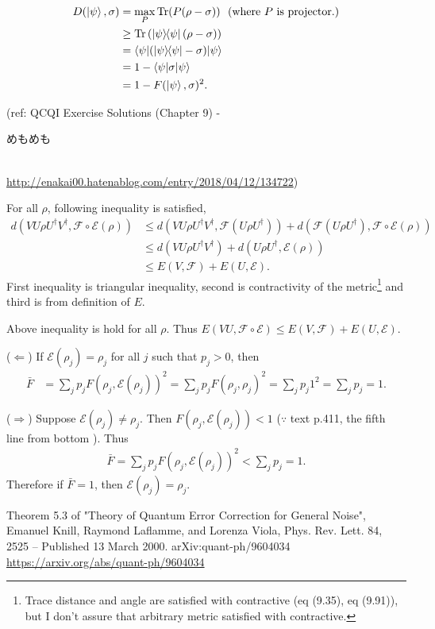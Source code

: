\begin{align*}
    D(\ket{\psi}, \sigma) &= \max_P \operatorname{Tr} (P (\rho - \sigma)) ~~(\text{where } P \text{ is projector.})\\
        &\geq \operatorname{Tr} \left(\ket{\psi}\hspace{-1mm} \bra{\psi} (\rho - \sigma)\right)\\
        &= \braket{\psi | (\ket{\psi}\hspace{-1mm} \bra{\psi} - \sigma) | \psi}\\
        &= 1 - \braket{\psi | \sigma | \psi}\\
        &= 1 - F(\ket{\psi}, \sigma)^2.
\end{align*}

(ref: QCQI Exercise Solutions (Chapter 9) - \begin{CJK}{UTF8}{ipxm}めもめも\end{CJK} \\ \url{http://enakai00.hatenablog.com/entry/2018/04/12/134722})

For all $\rho$, following inequality is satisfied,
\begin{align*}
        d(VU \rho U^\dagger V^\dagger, \mathcal{F} \circ \mathcal{E}(\rho))
        &\leq d(VU \rho U^\dagger V^\dagger, \mathcal{F}(U\rho U^\dagger)) + d(\mathcal{F}(U\rho U^\dagger), \mathcal{F}\circ \mathcal{E}(\rho)) \\
        &\leq d(VU \rho U^\dagger V^\dagger) + d(U\rho U^\dagger, \mathcal{E}(\rho))\\
        &\leq E(V, \mathcal{F})+ E(U, \mathcal{E}).
\end{align*}
First inequality is triangular inequality, second is contractivity of the metric\footnote{Trace distance and angle are satisfied with contractive (eq (9.35), eq (9.91)), but I don't assure that arbitrary metric satisfied with contractive. }
and third is from definition of $E$.

Above inequality is hold for all $\rho$. Thus $E(VU, \mathcal{F} \circ \mathcal{E}) \leq E(V, \mathcal{F})+ E(U, \mathcal{E})$.

($\Leftarrow$)
If $\mathcal{E}(\rho_j) = \rho_j$ for all $j$ such that $p_j > 0$, then
\begin{align*}
    \bar{F} &= \sum_j p_j F(\rho_j, \mathcal{E}(\rho_j))^2 = \sum_j p_j F(\rho_j, \rho_j)^2 = \sum_j p_j 1^2 = \sum_j p_j = 1.
\end{align*}

($\Rightarrow$) Suppose $\mathcal{E}(\rho_j) \neq \rho_j$.  Then $F(\rho_j, \mathcal{E}(\rho_j)) < 1$ ($\because$  text p.411, the fifth line from bottom ).
Thus
\begin{align*}
    \bar{F} = \sum_j p_j F(\rho_j, \mathcal{E}(\rho_j))^2 < \sum_j p_j = 1.
\end{align*}
Therefore if $\bar{F} = 1$, then $\mathcal{E}(\rho_j) = \rho_j$.



Theorem 5.3 of
"Theory of Quantum Error Correction for General Noise",
Emanuel Knill, Raymond Laflamme, and Lorenza Viola,
Phys. Rev. Lett. 84, 2525 – Published 13 March 2000.
arXiv:quant-ph/9604034
\url{https://arxiv.org/abs/quant-ph/9604034}



